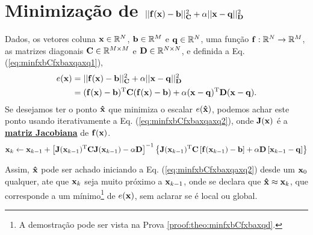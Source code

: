 \section{Minimização de $||\VECTOR{f}(\VECTOR{x})-\VECTOR{b}||_{\MATRIX{C}}^2+\alpha||\VECTOR{x}-\VECTOR{q}||_{\MATRIX{D}}^2$}



\begin{theorem}\label{theo:minfxbCfxbaxqaxq}
Dados,
os vetores coluna $\VECTOR{x}\in \mathbb{R}^N$, $\VECTOR{b}\in \mathbb{R}^M$ e $\VECTOR{q}\in \mathbb{R}^N$,  
uma função $\VECTOR{f}:\mathbb{R}^{N} \rightarrow \mathbb{R}^{M}$, 
as matrizes diagonais $\MATRIX{C} \in \mathbb{R}^{M\times M}$ e $\MATRIX{D} \in \mathbb{R}^{N\times N}$, e 
definida a Eq. (\ref{eq:minfxbCfxbaxqaxq1}),
\begin{align}\label{eq:minfxbCfxbaxqaxq1}
e(\VECTOR{x}) &=||\VECTOR{f}(\VECTOR{x})-\VECTOR{b}||_{\MATRIX{C}}^2+\alpha||\VECTOR{x}-\VECTOR{q}||_{\MATRIX{D}}^2\\
              & = (\VECTOR{f}(\VECTOR{x})-\VECTOR{b})^{\transpose}\MATRIX{C}(\VECTOR{f}(\VECTOR{x})-\VECTOR{b})+\alpha(\VECTOR{x}-\VECTOR{q})^{\transpose}\MATRIX{D}(\VECTOR{x}-\VECTOR{q}).
\end{align}
Se desejamos ter o ponto $\VECTOR{\hat{x}}$ que minimiza o escalar $e(\VECTOR{\hat{x}})$,
podemos achar este ponto usando iterativamente a Eq. (\ref{eq:minfxbCfxbaxqaxq2}),
onde  $\MATRIX{J}(\VECTOR{x})$ é a \hyperref[def:jacobian]{\textbf{matriz Jacobiana}}  de $\VECTOR{f}(\VECTOR{x})$.
\begin{equation}\label{eq:minfxbCfxbaxqaxq2}
\VECTOR{x}_{k}\leftarrow \VECTOR{x}_{k-1}+
\left[ \MATRIX{J}(\VECTOR{x}_{k-1})^{\transpose}\MATRIX{C} \MATRIX{J}(\VECTOR{x}_{k-1}) -\alpha\MATRIX{D} \right]^{-1}
 \left\{\MATRIX{J}(\VECTOR{x}_{k-1})^{\transpose}\MATRIX{C}\left[\VECTOR{f}(\VECTOR{x}_{k-1})-\VECTOR{b}\right]+\alpha\MATRIX{D}\left[\VECTOR{x}_{k-1}-\VECTOR{q}\right]\right\}
\end{equation}

Assim, $\VECTOR{\hat{x}}$ pode ser achado 
iniciando a Eq. (\ref{eq:minfxbCfxbaxqaxq2}) desde um $\VECTOR{x}_{0}$ qualquer, 
ate que $\VECTOR{x}_{k}$ seja muito próximo a $\VECTOR{x}_{k-1}$,
onde se declara que $\VECTOR{\hat{x}} \approx \VECTOR{x}_{k}$,
que corresponde a um mínimo\footnote{\label{ref:minfx}A
demostração pode ser vista na Prova \ref{proof:theo:minfxbCfxbaxqd}.} de $e(\VECTOR{x})$,
sem aclarar se é local ou global.



\end{theorem}
